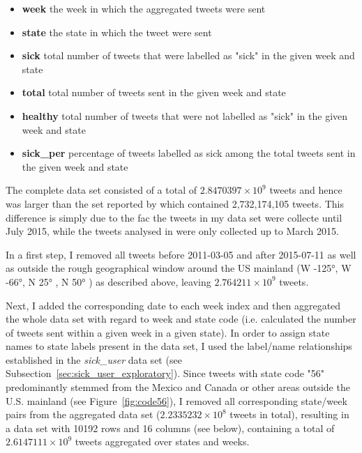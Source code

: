 \documentclass[11pt, a4paper]{article}\usepackage[]{graphicx}\usepackage[]{color}
\begin{document}
\begin{itemize}
  \item \textbf{week} the week in which the aggregated tweets were sent
  \item \textbf{state} the state in which the tweet were sent
  \item \textbf{sick} total number of tweets that were labelled as "sick" in the given week and state
  \item \textbf{total} total number of tweets sent in the given week and state
  \item \textbf{healthy} total number of tweets that were not labelled as "sick" in the given week and state
  \item \textbf{sick\_per} percentage of tweets labelled as sick among the total tweets sent in the given week and state
\end{itemize}


The complete data set consisted of a total of \ensuremath{2.8470397\times 10^{9}} tweets and hence was larger than the set reported by \citep{bodnar_data_2015} which contained 2,732,174,105 tweets. This difference is simply due to the fac the tweets in my data set were collecte until July 2015, while the tweets analysed in \citep{bodnar_data_2015} were only collected up to March 2015.\newline

In a first step, I removed all tweets before 2011-03-05 and after 2015-07-11 as well as outside the rough geographical window around the US mainland (W -125°, W -66°, N 25° , N 50° ) as described above, leaving \ensuremath{2.764211\times 10^{9}} tweets. \newline

Next, I added the corresponding date to each week index and then aggregated the whole data set with regard to week and state code (i.e. calculated the number of tweets sent within a given week in a given state). In order to assign state names to state labels present in the data set, I used the label/name relationships established in the \textit{sick\_user} data set (see Subsection~\ref{sec:sick_user_exploratory}). Since tweets with state code "56" predominantly stemmed from the Mexico and Canada or other areas outside the U.S. mainland (see Figure~\ref{fig:code56}), I removed all corresponding state/week pairs from the aggregated data set (\ensuremath{2.2335232\times 10^{8}} tweets in total), resulting in a data set with 10192 rows and 16 columns (see below), containing a total of \ensuremath{2.6147111\times 10^{9}} tweets aggregated over states and weeks.
\end{document}
